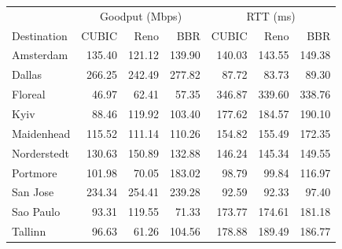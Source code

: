 \begin{tabular}{lrrrrrr}
\hline
& \multicolumn{3}{c}{Goodput (Mbps)} & \multicolumn{3}{c}{RTT (ms)} \\
Destination & CUBIC & Reno & BBR & CUBIC & Reno & BBR \\
\hline
Amsterdam & 135.40 & 121.12 & 139.90 & 140.03 & 143.55 & 149.38 \\
Dallas & 266.25 & 242.49 & 277.82 & 87.72 & 83.73 & 89.30 \\
Floreal & 46.97 & 62.41 & 57.35 & 346.87 & 339.60 & 338.76 \\
Kyiv & 88.46 & 119.92 & 103.40 & 177.62 & 184.57 & 190.10 \\
Maidenhead & 115.52 & 111.14 & 110.26 & 154.82 & 155.49 & 172.35 \\
Norderstedt & 130.63 & 150.89 & 132.88 & 146.24 & 145.34 & 149.55 \\
Portmore & 101.98 & 70.05 & 183.02 & 98.79 & 99.84 & 116.97 \\
San Jose & 234.34 & 254.41 & 239.28 & 92.59 & 92.33 & 97.40 \\
Sao Paulo & 93.31 & 119.55 & 71.33 & 173.77 & 174.61 & 181.18 \\
Tallinn & 96.63 & 61.26 & 104.56 & 178.88 & 189.49 & 186.77 \\
\hline
\end{tabular}
